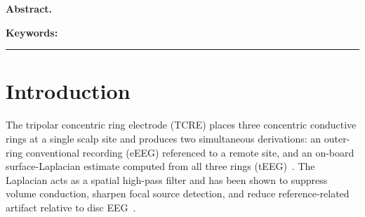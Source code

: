 \documentclass[10pt,a4paper]{article}
\newcommand{\PreviewCorres}{}
\newcommand{\PreviewAbstract}{}
\newcommand{\PreviewKeywords}{}
\begin{document}
\ifpreview
\maketitle
\begin{center}\small\PreviewCorres\end{center}
\begin{center}
\begin{minipage}{0.9\linewidth}
\noindent\textbf{Abstract.} \PreviewAbstract\par\medskip
\noindent\textbf{Keywords:} \PreviewKeywords
\end{minipage}
\end{center}
\medskip
\hrule
\medskip
\fi

\section{Introduction}

The tripolar concentric ring electrode (TCRE) places three concentric conductive rings at a single scalp site and produces two simultaneous derivations: an outer-ring conventional recording (eEEG) referenced to a remote site, and an on-board surface-Laplacian estimate computed from all three rings (tEEG)~\cite{besio2006}. The Laplacian acts as a spatial high-pass filter and has been shown to suppress volume conduction, sharpen focal source detection, and reduce reference-related artifact relative to disc EEG~\cite{besio2006,koka2007}.
\end{document}
